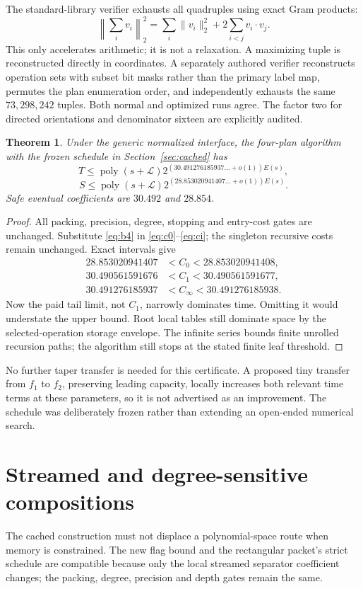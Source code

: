 \documentclass[11pt,letterpaper]{article}
\newtheorem{theorem}{Theorem}[section]\newtheorem{lemma}[theorem]{Lemma}\newtheorem{proposition}[theorem]{Proposition}\newtheorem{corollary}[theorem]{Corollary}
\theoremstyle{remark}\newtheorem{remark}[theorem]{Remark}
\newcommand{\poly}{\operatorname{poly}}\newcommand{\vTwo}{v_2}\newcommand{\ceil}[1]{\left\lceil#1\right\rceil}\newcommand{\floor}[1]{\left\lfloor#1\right\rfloor}\newcommand{\LL}{\mathcal L}
\begin{document}
The standard-library verifier exhausts all quadruples using exact Gram products:
\[
 \left\|\sum_iv_i\right\|_2^2
 =\sum_i\|v_i\|_2^2+2\sum_{i<j}v_i\cdot v_j.
\]
This only accelerates arithmetic; it is not a relaxation. A maximizing tuple is reconstructed directly in coordinates. A separately authored verifier reconstructs operation sets with subset bit masks rather than the primary label map, permutes the plan enumeration order, and independently exhausts the same $73{,}298{,}242$ tuples. Both normal and optimized runs agree. The factor two for directed orientations and denominator sixteen are explicitly audited.

\begin{theorem}\label{thm:finalcached}
Under the generic normalized interface, the four-plan algorithm with the frozen schedule in Section~\ref{sec:cached} has
\[
 T\le\poly(s+\LL)2^{(30.491276185937\ldots+o(1))E(s)},
\]
\[
 S\le\poly(s+\LL)2^{(28.853020941407\ldots+o(1))E(s)}.
\]
Safe eventual coefficients are $30.492$ and $28.854$.
\end{theorem}
\begin{proof}
All packing, precision, degree, stopping and entry-cost gates are unchanged. Substitute \eqref{eq:b4} in \eqref{eq:c0}--\eqref{eq:ci}; the singleton recursive costs remain unchanged. Exact intervals give
\begin{align*}
 28.853020941407&<C_0<28.853020941408,\\
 30.490561591676&<C_1<30.490561591677,\\
 30.491276185937&<C_\infty<30.491276185938.
\end{align*}
Now the paid tail limit, not $C_1$, narrowly dominates time. Omitting it would understate the upper bound. Root local tables still dominate space by the selected-operation storage envelope. The infinite series bounds finite unrolled recursion paths; the algorithm still stops at the stated finite leaf threshold.
\end{proof}

No further taper transfer is needed for this certificate. A proposed tiny transfer from $f_1$ to $f_2$, preserving leading capacity, locally increases both relevant time terms at these parameters, so it is not advertised as an improvement. The schedule was deliberately frozen rather than extending an open-ended numerical search.

\section{Streamed and degree-sensitive compositions}
\label{sec:schedules}
The cached construction must not displace a polynomial-space route when memory is constrained. The new flag bound and the rectangular packet's strict schedule are compatible because only the local streamed separator coefficient changes; the packing, degree, precision and depth gates remain the same.
\end{document}
